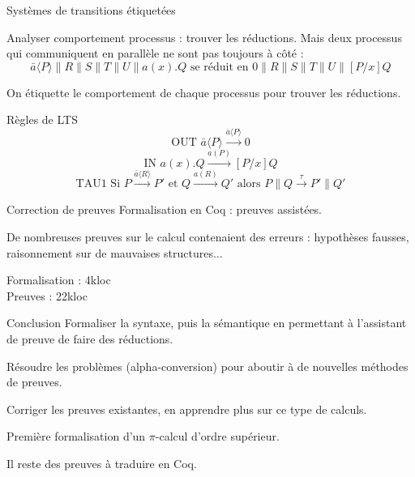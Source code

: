 \documentclass{beamer}
\begin{document}
\begin{frame}{Systèmes de transitions étiquetées}

Analyser comportement processus : trouver les réductions.
Mais deux processus qui communiquent en parallèle ne sont pas toujours à côté :
$$\bar{a}\langle P\rangle\|R\|S\|T\|U\|a(x).Q \text{ se réduit en } 0\|R\|S\|T\|U\|[P/x]Q$$

On étiquette le comportement de chaque processus pour trouver les réductions.

\begin{block}{Règles de LTS}
$$\text{OUT } \bar{a}\langle P\rangle \overset{\bar{a}\langle P\rangle}{\longrightarrow} 0$$
$$\text{IN } a(x).Q \overset{a(P)}{\longrightarrow} [P/x]Q$$
$$\text{TAU1 Si } P\overset{\bar{a}\langle R\rangle}{\longrightarrow} P' \text{ et } Q\overset{a(R)}{\longrightarrow} Q' \text{ alors } P\|Q \overset{\tau}{\longrightarrow} P'\|Q'$$
\end{block}

\end{frame}

\begin{frame}{Correction de preuves}
Formalisation en Coq : preuves assistées.

De nombreuses preuves sur le calcul contenaient des erreurs : hypothèses fausses, raisonnement sur de mauvaises structures...

Formalisation : 4kloc\\
Preuves : 22kloc
\end{frame}

\begin{frame}{Conclusion}
Formaliser la syntaxe, puis la sémantique en permettant à l'assistant de preuve de faire des réductions.

Résoudre les problèmes (alpha-conversion) pour aboutir à de nouvelles méthodes de preuves.

Corriger les preuves existantes, en apprendre plus sur ce type de calculs.

Première formalisation d'un $\pi$-calcul d'ordre supérieur.

Il reste des preuves à traduire en Coq.
\end{frame}
\end{document}
